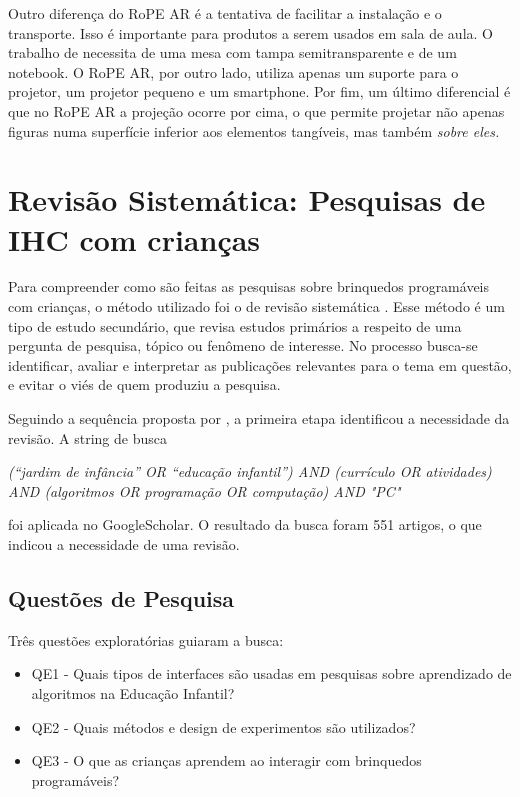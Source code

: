 {Outro diferença do RoPE AR é a tentativa de facilitar a instalação e o transporte. Isso é importante para produtos a serem usados em sala de aula. O trabalho de  necessita de uma mesa com tampa semitransparente e de um notebook. O RoPE AR, por outro lado, utiliza apenas um suporte para o projetor, um projetor pequeno e um smartphone. 
Por fim, um último diferencial é que no RoPE AR a projeção ocorre por cima, o que permite projetar não apenas figuras numa superfície inferior aos elementos tangíveis, mas também \it{sobre} eles.

\section{Revisão Sistemática: Pesquisas de IHC com crianças}
\label{sec_rsl}
Para compreender como são feitas as pesquisas sobre brinquedos programáveis com crianças, o método utilizado foi o de revisão sistemática \cite{kitchenham_guidelines_2007}. Esse método é um tipo de estudo secundário, que revisa estudos primários a respeito de uma pergunta de pesquisa, tópico ou fenômeno de interesse. No processo busca-se identificar, avaliar e interpretar as publicações relevantes para o tema em questão, e evitar o viés de quem produziu a pesquisa.

Seguindo a sequência proposta por , a primeira etapa identificou a necessidade da revisão. A string de busca 

\textit
{
    (“jardim de infância” OR “educação infantil”) AND (currículo OR atividades) AND (algoritmos OR programação OR computação) AND "\acl{PC}"
}

foi aplicada no GoogleScholar. O resultado da busca foram 551 artigos, o que indicou a necessidade de uma revisão.

\subsection{Questões de Pesquisa}
Três questões exploratórias guiaram a busca:

\begin{itemize}
    \item QE1 - Quais tipos de interfaces são usadas em pesquisas sobre aprendizado de algoritmos na Educação Infantil? 
    \item QE2 - Quais métodos e design de experimentos são utilizados?
    \item QE3 - O que as crianças aprendem ao interagir com brinquedos programáveis?
\end{itemize}

}
